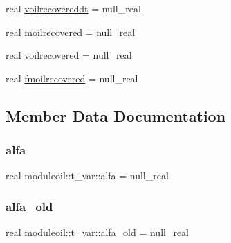\begin{DoxyCompactItemize}
\item 
real \mbox{\hyperlink{structmoduleoil_1_1t__var_a23c069ec7f48d5784aaa38b8cc750f4b}{voilrecovereddt}} = null\+\_\+real
\item 
real \mbox{\hyperlink{structmoduleoil_1_1t__var_aec172fd9dd1ffaa06e375fd3f6f5b070}{moilrecovered}} = null\+\_\+real
\item 
real \mbox{\hyperlink{structmoduleoil_1_1t__var_ab7ec4a16ad6e185ac4a7d5c107d0ef66}{voilrecovered}} = null\+\_\+real
\item 
real \mbox{\hyperlink{structmoduleoil_1_1t__var_ad36c5b4cd3477509ee247aae2e5e5135}{fmoilrecovered}} = null\+\_\+real
\end{DoxyCompactItemize}


\subsection{Member Data Documentation}
\mbox{\label{structmoduleoil_1_1t__var_a38597ca805d75600f67d820d181d45c3}} 
\subsubsection{\texorpdfstring{alfa}{alfa}}
{\footnotesize\ttfamily real moduleoil\+::t\+\_\+var\+::alfa = null\+\_\+real\hspace{0.3cm}{\ttfamily [private]}}

\mbox{\label{structmoduleoil_1_1t__var_a4f5a3c35900ad5dfa2cfb2f2f8c6d12a}} 
\subsubsection{\texorpdfstring{alfa\+\_\+old}{alfa\_old}}
{\footnotesize\ttfamily real moduleoil\+::t\+\_\+var\+::alfa\+\_\+old = null\+\_\+real\hspace{0.3cm}{\ttfamily [private]}}

\mbox{\label{structmoduleoil_1_1t__var_a75506c880fc27d71133212a17a8fe240}} 

